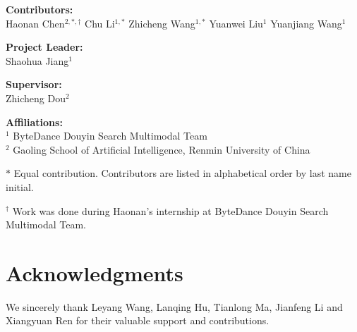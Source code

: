 \contributionlist

\textbf{Contributors:} \\
Haonan Chen$^{2,*,\dagger}$ \quad Chu Li$^{1,*}$ \quad Zhicheng Wang$^{1,*}$ \quad Yuanwei Liu$^{1}$ \quad Yuanjiang Wang$^{1}$

\textbf{Project Leader:} \\
Shaohua Jiang$^{1}$

\textbf{Supervisor:} \\
Zhicheng Dou$^{2}$

\textbf{Affiliations:} \\
$^{1}$ ByteDance Douyin Search Multimodal Team \\
$^{2}$ Gaoling School of Artificial Intelligence, Renmin University of China

\vspace{2pt}


\noindent
$*$ Equal contribution. Contributors are listed in alphabetical order by last name initial.


\noindent
$^\dagger$ Work was done during Haonan's internship at ByteDance Douyin Search Multimodal Team.



\section{Acknowledgments}
We sincerely thank Leyang Wang, Lanqing Hu, Tianlong Ma, Jianfeng Li and Xiangyuan Ren for their valuable support and contributions.
